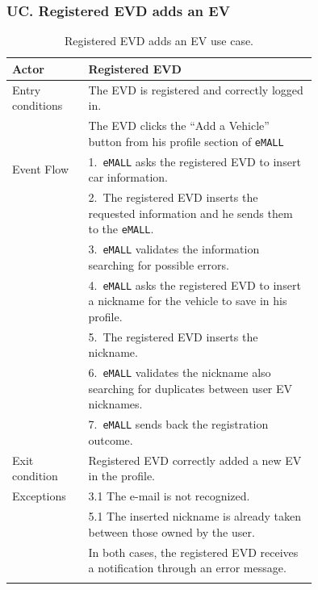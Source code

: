 \subsubsection*{UC\cuc . Registered EVD adds an EV}
\begin{center}
    \begin{longtable}{lp{0.75\linewidth}}
        \hline
        Actor            & Registered EVD                                                                                        \\
        \hline
        Entry conditions & The EVD is registered and correctly logged in.                                                        \\
        & The EVD clicks the ``Add a Vehicle'' button from his profile section of \verb|eMALL|                  \\
        \hline
        Event Flow       & 1.\ \verb|eMALL| asks the registered EVD to insert car information.                                   \\
        & 2.\ The registered EVD inserts the requested information and he sends them to the \verb|eMALL|.       \\
        & 3.\ \verb|eMALL| validates the information searching for possible errors.                             \\
        & 4.\ \verb|eMALL| asks the registered EVD to insert a nickname for the vehicle to save in his profile. \\
        & 5.\ The registered EVD inserts the nickname.                                                          \\
        & 6.\ \verb|eMALL| validates the nickname also searching for duplicates between user EV nicknames.      \\
        & 7.\ \verb|eMALL| sends back the registration outcome.                                                 \\
        \hline
        Exit condition   & Registered EVD correctly added a new EV in the profile.                                               \\
        \hline
        Exceptions       & 3.1 The e-mail is not recognized.                                                                     \\
        & 5.1 The inserted nickname is already taken between those owned by the user.                           \\
        & In both cases, the registered EVD receives a notification through an error message.                   \\
        \hline
        \caption{Registered EVD adds an EV use case.}
        \label{tab: EVD_adds_a_vehicle_use_case}
    \end{longtable}


\end{center}
